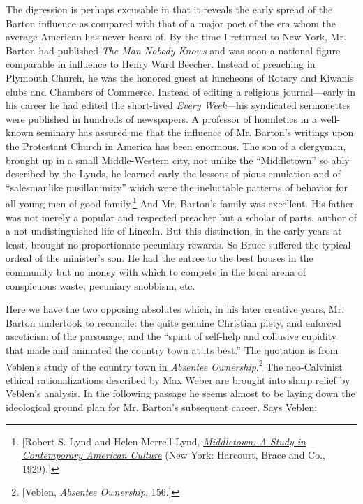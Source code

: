 \documentclass[nohyper,openany,nobib]{tufte-book}
\begin{document}
The digression is perhaps excusable in that it reveals the early spread
of the Barton influence as compared with that of a major poet of the era
whom the average American has never heard of. By the time I returned to
New York, Mr. Barton had published \emph{The Man Nobody Knows} and was
soon a national figure comparable in influence to Henry Ward Beecher.
Instead of preaching in Plymouth Church, he was the honored guest at
luncheons of Rotary and Kiwanis clubs and Chambers of Commerce. Instead
of editing a religious journal---early in his career he had edited the
short-lived \emph{Every Week}---his syndicated sermonettes were
published in hundreds of newspapers. A professor of homiletics in a
well-known seminary has assured me that the influence of Mr. Barton's
writings upon the Protestant Church in America has been enormous. The
son of a clergyman, brought up in a small Middle-Western city, not
unlike the ``Middletown'' so ably described by the Lynds, he learned
early the lessons of pious emulation and of ``salesmanlike
pusillanimity'' which were the ineluctable patterns of behavior for all
young men of good family.\footnote{{[}Robert S. Lynd and Helen Merrell Lynd,
  \emph{\href{http://www.worldcat.org/oclc/1001579439}{Middletown: A
  Study in Contemporary American Culture}} (New York: Harcourt, Brace
  and Co., 1929).{]}} And Mr. Barton's family was excellent. His
father was not merely a popular and respected preacher but a scholar of
parts, author of a not undistinguished life of Lincoln. But this
distinction, in the early years at least, brought no proportionate
pecuniary rewards. So Bruce suffered the typical ordeal of the
minister's son. He had the entree to the best houses in the community
but no money with which to compete in the local arena of conspicuous
waste, pecuniary snobbism, etc.

Here we have the two opposing absolutes which, in his later creative
years, Mr. Barton undertook to reconcile: the quite genuine Christian
piety, and enforced asceticism of the parsonage, and the ``spirit of
self-help and collusive cupidity that made and animated the country town
at its best.'' The quotation is from Veblen's study of the country town
in \emph{Absentee Ownership}.\footnote{{[}Veblen, \emph{Absentee Ownership}, 156.{]}} The neo-Calvinist ethical
rationalizations described by Max Weber are brought into sharp relief by
Veblen's analysis. In the following passage he seems almost to be laying
down the ideological ground plan for Mr. Barton's subsequent career.
Says Veblen:
\end{document}
